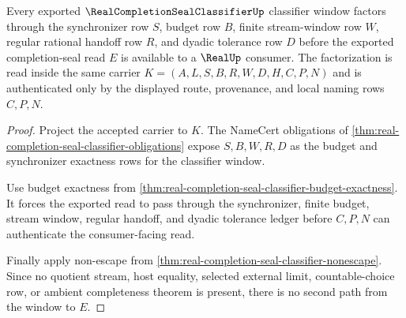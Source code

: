 \begin{theorem}
\label{thm:real-completion-seal-classifier-window-factorization}
Every exported $\RealCompletionSealClassifierUp$ classifier window factors through the synchronizer row $S$, budget row $B$, finite stream-window row $W$, regular rational handoff row $R$, and dyadic tolerance row $D$ before the exported completion-seal read $E$ is available to a $\RealUp$ consumer. The factorization is read inside the same carrier $K=(A,L,S,B,R,W,D,H,C,P,N)$ and is authenticated only by the displayed route, provenance, and local naming rows $C,P,N$.
\end{theorem}
\begin{proof}
Project the accepted carrier to $K$. The NameCert obligations of \autoref{thm:real-completion-seal-classifier-obligations} expose $S,B,W,R,D$ as the budget and synchronizer exactness rows for the classifier window.

Use budget exactness from \autoref{thm:real-completion-seal-classifier-budget-exactness}. It forces the exported read to pass through the synchronizer, finite budget, stream window, regular handoff, and dyadic tolerance ledger before $C,P,N$ can authenticate the consumer-facing read.

Finally apply non-escape from \autoref{thm:real-completion-seal-classifier-nonescape}. Since no quotient stream, host equality, selected external limit, countable-choice row, or ambient completeness theorem is present, there is no second path from the window to $E$.
\end{proof}

